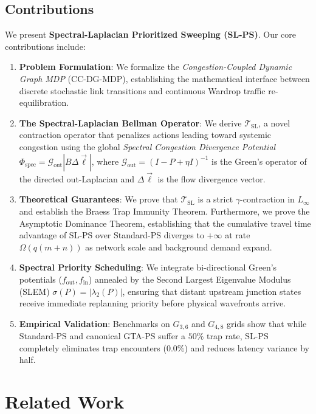 \documentclass[11pt,a4paper]{article}
\begin{document}
\subsection{Contributions}
We present \textbf{Spectral-Laplacian Prioritized Sweeping (SL-PS)}. Our core contributions include:
\begin{enumerate}
    \item \textbf{Problem Formulation}: We formalize the \textit{Congestion-Coupled Dynamic Graph MDP} (CC-DG-MDP), establishing the mathematical interface between discrete stochastic link transitions and continuous Wardrop traffic re-equilibration.
    \item \textbf{The Spectral-Laplacian Bellman Operator}: We derive $\mathcal{T}_{\text{SL}}$, a novel contraction operator that penalizes actions leading toward systemic congestion using the global \textit{Spectral Congestion Divergence Potential} $\Phi_{\text{spec}} = \mathcal{G}_{\text{out}} |B \Delta \vec{\ell}|$, where $\mathcal{G}_{\text{out}} = (I - P + \eta I)^{-1}$ is the Green's operator of the directed out-Laplacian and $\Delta \vec{\ell}$ is the flow divergence vector.
    \item \textbf{Theoretical Guarantees}: We prove that $\mathcal{T}_{\text{SL}}$ is a strict $\gamma$-contraction in $L_\infty$ and establish the Braess Trap Immunity Theorem. Furthermore, we prove the Asymptotic Dominance Theorem, establishing that the cumulative travel time advantage of SL-PS over Standard-PS diverges to $+\infty$ at rate $\Omega(q(m+n))$ as network scale and background demand expand.
    \item \textbf{Spectral Priority Scheduling}: We integrate bi-directional Green's potentials ($f_{\text{out}}, f_{\text{in}}$) annealed by the Second Largest Eigenvalue Modulus (SLEM) $\sigma(P) = |\lambda_2(P)|$, ensuring that distant upstream junction states receive immediate replanning priority before physical wavefronts arrive.
    \item \textbf{Empirical Validation}: Benchmarks on $G_{3,6}$ and $G_{4,8}$ grids show that while Standard-PS and canonical GTA-PS suffer a $50\%$ trap rate, SL-PS completely eliminates trap encounters ($0.0\%$) and reduces latency variance by half.
\end{enumerate}

\section{Related Work}
\label{sec:related}
\end{document}
